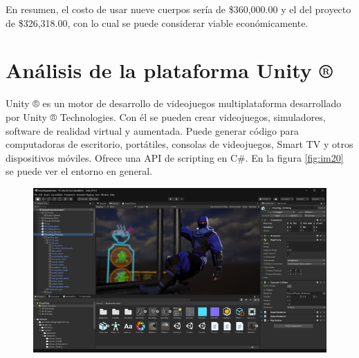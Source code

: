 En resumen, el costo de usar nueve cuerpos sería de \$360,000.00 y el del proyecto de \$326,318.00, con lo cual se puede considerar viable económicamente.\\

\section{Análisis de la plataforma Unity ®}
Unity ® es un motor de desarrollo de videojuegos multiplataforma desarrollado por Unity ® Technologies. Con él se pueden crear videojuegos, simuladores, 
software de realidad virtual y aumentada. Puede generar código para computadoras de escritorio, portátiles, consolas de videojuegos, Smart TV y otros dispositivos móviles. 
Ofrece una API de scripting en C\#. En la figura \ref{fig:im20} se puede ver el entorno en general.\\
\begin{figure}[H]
	\begin{center}
 		\includegraphics[width = .5\textwidth]{source/images/image33.png}
	\end{center} 
\end{figure}

